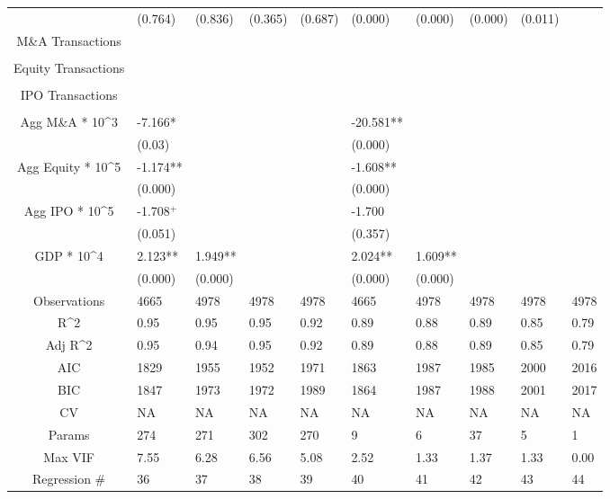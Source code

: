 \documentclass{article}
\begin{document}
\begin{table}[H]
\begin{tabular}{|clllllllll|}
   & (0.764) & (0.836) & (0.365) & (0.687) & (0.000) & (0.000) & (0.000) & (0.011) &  \\
  M\&A Transactions &  &  &  &  &  &  &  &  &  \\
   &  &  &  &  &  &  &  &  &  \\
  Equity Transactions &  &  &  &  &  &  &  &  &  \\
   &  &  &  &  &  &  &  &  &  \\
  IPO Transactions &  &  &  &  &  &  &  &  &  \\
   &  &  &  &  &  &  &  &  &  \\
  Agg M\&A * 10^3 & -7.166* &  &  &  & -20.581** &  &  &  &  \\
   & (0.03) &  &  &  & (0.000) &  &  &  &  \\
  Agg Equity * 10^5 & -1.174** &  &  &  & -1.608** &  &  &  &  \\
   & (0.000) &  &  &  & (0.000) &  &  &  &  \\
  Agg IPO * 10^5 & -1.708$^{+}$ &  &  &  & -1.700 &  &  &  &  \\
   & (0.051) &  &  &  & (0.357) &  &  &  &  \\
  GDP * 10^4 & 2.123** & 1.949** &  &  & 2.024** & 1.609** &  &  &  \\
   & (0.000) & (0.000) &  &  & (0.000) & (0.000) &  &  &  \\
  \hline
 Observations & 4665 & 4978 & 4978 & 4978 & 4665 & 4978 & 4978 & 4978 & 4978 \\
  R^2 & 0.95 & 0.95 & 0.95 & 0.92 & 0.89 & 0.88 & 0.89 & 0.85 & 0.79 \\
  Adj R^2 & 0.95 & 0.94 & 0.95 & 0.92 & 0.89 & 0.88 & 0.89 & 0.85 & 0.79 \\
  AIC & 1829 & 1955 & 1952 & 1971 & 1863 & 1987 & 1985 & 2000 & 2016 \\
  BIC & 1847 & 1973 & 1972 & 1989 & 1864 & 1987 & 1988 & 2001 & 2017 \\
  CV & NA & NA & NA & NA & NA & NA & NA & NA & NA \\
  Params & 274 & 271 & 302 & 270 & 9 & 6 & 37 & 5 & 1 \\
  Max VIF & 7.55 & 6.28 & 6.56 & 5.08 & 2.52 & 1.33 & 1.37 & 1.33 & 0.00 \\
  Regression \# & 36 & 37 & 38 & 39 & 40 & 41 & 42 & 43 & 44 \\
   \hline
\end{tabular}

\end{table}
\end{document}
